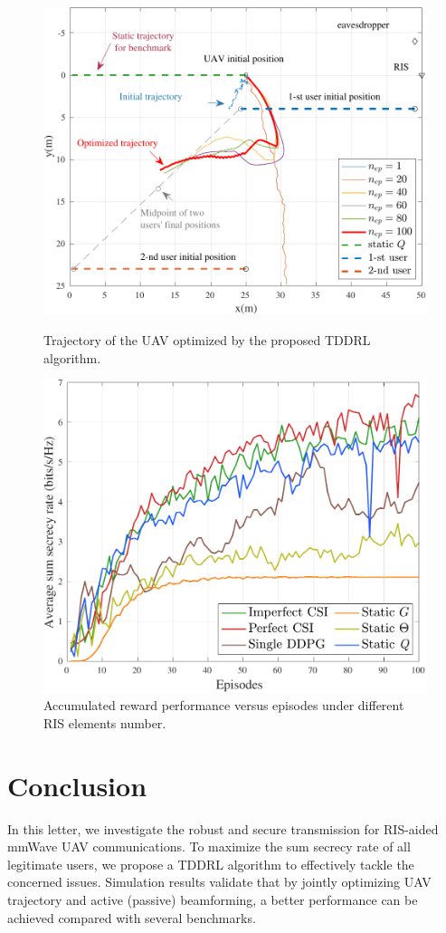 \documentclass[12pt, draftclsnofoot, onecolumn]{IEEEtran}
\begin{document}
\begin{figure}[t]
  \centering
  \begin{minipage}[t]{0.48\textwidth}
    \centering
    \includegraphics[width=0.8\linewidth]{./plot/trajectory/trajectory.pdf}%
    \caption{Trajectory of the UAV optimized by the proposed TDDRL algorithm.}  %
    \label{trajectory}
  \end{minipage}
  \begin{minipage}[t]{0.48\textwidth}
    \centering
    \includegraphics[width=0.8\linewidth]{./plot/compare/compare.pdf}%
	  \caption{Accumulated reward performance versus episodes under different RIS elements number.}  %
  \label{compare}
  \end{minipage}
  
\end{figure}

\section{Conclusion}
In this letter, we investigate the robust and secure transmission for RIS-aided mmWave UAV communications. To maximize the sum secrecy rate of all legitimate users, we propose a TDDRL algorithm to effectively tackle the concerned issues. Simulation results validate that by jointly optimizing UAV trajectory and active (passive) beamforming, a better performance can be achieved compared with several benchmarks.
\end{document}
